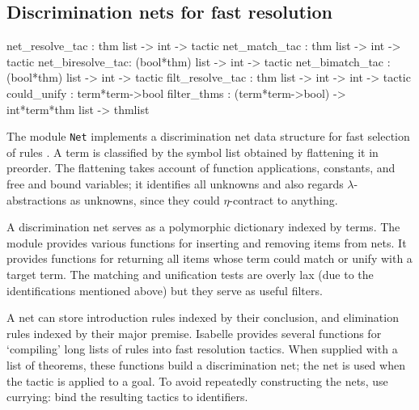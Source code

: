 \subsection{Discrimination nets for fast resolution}\label{filt_resolve_tac}
\begin{ttbox} 
net_resolve_tac  : thm list -> int -> tactic
net_match_tac    : thm list -> int -> tactic
net_biresolve_tac: (bool*thm) list -> int -> tactic
net_bimatch_tac  : (bool*thm) list -> int -> tactic
filt_resolve_tac : thm list -> int -> int -> tactic
could_unify      : term*term->bool
filter_thms      : (term*term->bool) -> int*term*thm list -> thm{\ts}list
\end{ttbox}
The module {\tt Net} implements a discrimination net data structure for
fast selection of rules \cite[Chapter 14]{charniak80}.  A term is
classified by the symbol list obtained by flattening it in preorder.
The flattening takes account of function applications, constants, and free
and bound variables; it identifies all unknowns and also regards
$\lambda$-abstractions as unknowns, since they could $\eta$-contract to
anything.  

A discrimination net serves as a polymorphic dictionary indexed by terms.
The module provides various functions for inserting and removing items from
nets.  It provides functions for returning all items whose term could match
or unify with a target term.  The matching and unification tests are
overly lax (due to the identifications mentioned above) but they serve as
useful filters.

A net can store introduction rules indexed by their conclusion, and
elimination rules indexed by their major premise.  Isabelle provides
several functions for `compiling' long lists of rules into fast
resolution tactics.  When supplied with a list of theorems, these functions
build a discrimination net; the net is used when the tactic is applied to a
goal.  To avoid repeatedly constructing the nets, use currying: bind the
resulting tactics to \ML{} identifiers.

